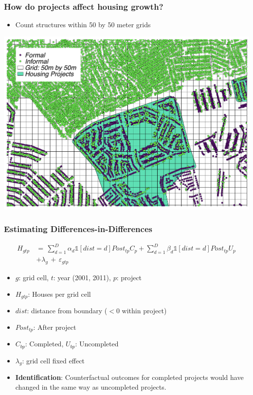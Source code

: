 \documentclass[aspectratio=149]{beamer}
\begin{document}
\begin{frame}
\frametitle{How do projects affect housing growth?}
\begin{itemize}
  \item Count structures within 50 by 50 meter grids
\end{itemize}
\begin{center}
\includegraphics[scale=0.33]{bblu_map.pdf}
\vspace{-3mm}
\end{center}
\end{frame}


\begin{frame}
\frametitle{Estimating Differences-in-Differences}

\begin{align*}
H_{gtp} \, &= \, \sum_{d=1}^{D} \alpha_d \mathds{1}[dist=d] Post_{tp} C_p + \sum_{d=1}^{D} \beta_d \mathds{1}[dist=d] Post_{tp} U_p   \\
& +  \lambda_g \, + \, \varepsilon_{gtp}
\end{align*}

\begin{itemize}
\item $g$: grid cell, $t$: year (2001, 2011), $p$: project
\item $H_{gtp}$: Houses per grid cell
\item $dist$: distance from boundary ($<0$ within project)
\item $Post_{tp}$: After project
\item $C_{bp}$: Completed, $U_{bp}$: Uncompleted
\item $\lambda_g$: grid cell fixed effect
\end{itemize}

\begin{itemize}
  \item \textbf{Identification}: Counterfactual outcomes for completed projects would have changed in the same way as uncompleted projects.
\end{itemize}

\end{frame}
\end{document}
